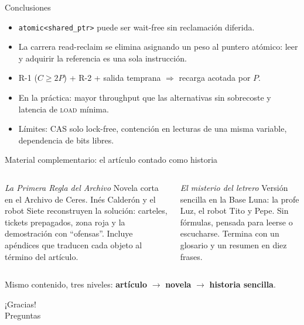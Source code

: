 \documentclass[aspectratio=169,11pt,xcolor=table]{beamer}
\begin{document}
\begin{frame}{Conclusiones}
  \begin{itemize}
    \item \texttt{atomic<shared\_ptr>} puede ser \alert{wait-free sin reclamación diferida}.
    \item La carrera read-reclaim se elimina asignando un \alert{peso} al puntero atómico: leer y adquirir la referencia es una sola instrucción.
    \item R-1 ($C\geq2P$) + R-2 + salida temprana $\Rightarrow$ recarga acotada por $P$.
    \item En la práctica: \alert{mayor throughput} que las alternativas sin sobrecoste y \alert{latencia de \textsc{load} mínima}.
    \item Límites: CAS solo lock-free, contención en lecturas de una misma variable, dependencia de bits libres.
  \end{itemize}
  \vspace{3mm}
\end{frame}

\begin{frame}{Material complementario: el artículo contado como historia}
  \begin{columns}[T]
    \begin{block}{\emph{La Primera Regla del Archivo}}
      \small Novela corta en el Archivo de Ceres. Inés Calderón y el robot Siete reconstruyen la solución: carteles, tickets prepagados, zona roja y la demostración con ``ofensas''. Incluye apéndices que traducen cada objeto al término del artículo.
    \end{block}
    \begin{block}{\emph{El misterio del letrero}}
      \small Versión sencilla en la Base Luna: la profe Luz, el robot Tito y Pepe. Sin fórmulas, pensada para leerse o escucharse. Termina con un glosario y un resumen en diez frases.
    \end{block}
  \end{columns}
  \vspace{3mm}
  \centering
  {\small Mismo contenido, tres niveles: \textbf{artículo} $\rightarrow$ \textbf{novela} $\rightarrow$ \textbf{historia sencilla}.}
\end{frame}


\begin{frame}[plain]
  \centering
  \vspace*{20mm}
  {\Huge\color{azul} ¡Gracias!}\\[6mm]
  {\large Preguntas}
\end{frame}
\end{document}
